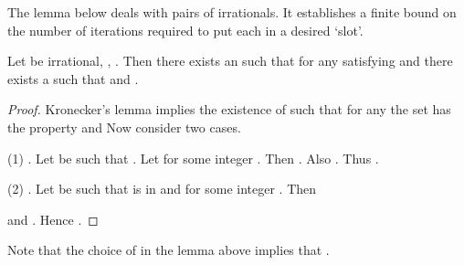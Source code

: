 \documentclass[12pt]{article}
\begin{document}
The lemma below deals with pairs of irrationals. It establishes a
finite bound on the number of iterations required to put each in a
desired `slot'.
\begin{lemma}\label{mixing}Let  be irrational,
, . Then there
exists an  such that for any
 satisfying
 and
 there exists a  such that  and
.
\end{lemma}
\begin{proof}Kronecker's lemma implies the existence of
 such that for any  the set 
 has the property
 and 
 Now consider two cases. 

(1) . Let  be such 
that . Let
 for some integer .
Then .
Also
. Thus .

(2) . Let  be such that
 is in  and
 for some integer .
Then

and . Hence
.
\end{proof}
Note that the choice of  in the lemma above implies that
.
\end{document}
